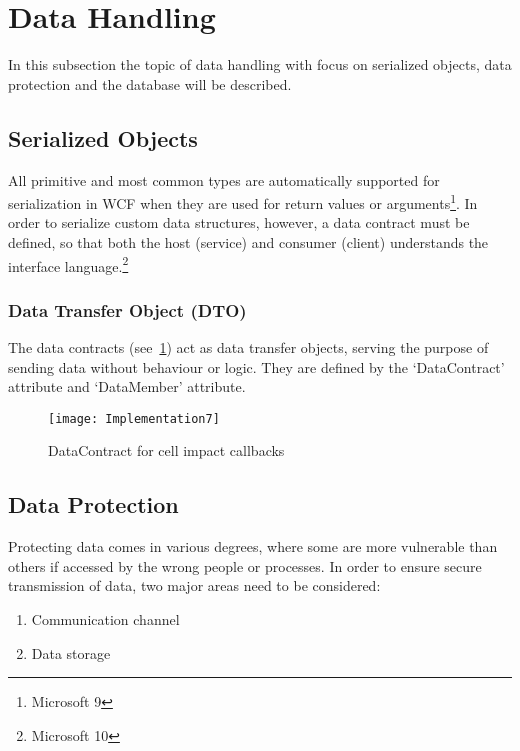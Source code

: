 \section {Data Handling}
In this subsection the topic of data handling with focus on serialized
objects, data protection and the database will be described.

\subsection {Serialized Objects}
All primitive and most common types are automatically supported for
serialization in WCF when they are used for return values or
arguments\footnote{Microsoft 9}. In order to serialize custom data
structures, however, a data contract must be defined, so that both
the host (service) and consumer (client) understands the interface
language.\footnote{Microsoft 10}

\subsubsection {Data Transfer Object (DTO)}
The data contracts (see~\ref{fig:implementation7}) act as data
transfer objects, serving the purpose of sending data without behaviour
 or logic. They are defined by the ‘DataContract’ attribute and
  ‘DataMember’ attribute.

\begin{figure}[h]
\centerline{\texttt{[image: Implementation7]}}
\caption {DataContract for cell impact callbacks}
\label {fig:implementation7}
\end{figure}

\subsection {Data Protection}
Protecting data comes in various degrees, where some are more
vulnerable than others if accessed by the wrong people or processes.
 In order to ensure secure transmission of data, two major areas
  need to be considered:
\begin{enumerate}
	\item Communication channel
	\item Data storage
\end{enumerate}

